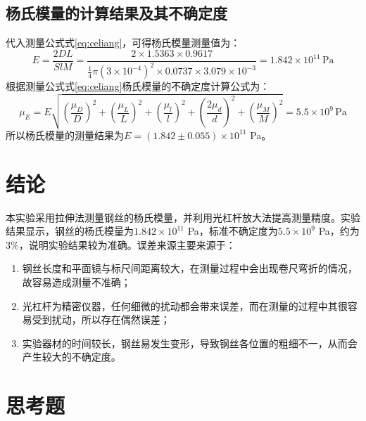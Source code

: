 \documentclass[a4paper]{extarticle}
\begin{document}
    \subsection{杨氏模量的计算结果及其不确定度}
    \hspace{2em}
    代入测量公式式\ref{eq:celiang}，可得杨氏模量测量值为：
    \begin{equation*}
        E=\frac{2DL}{SlM}=\frac{2\times1.5363\times0.9617}{\frac{1}{4}\pi\left(3\times10^{-4}\right)^2\times0.0737\times3.079\times10^{-3}}=1.842\times10^{11}\,\text{Pa}
    \end{equation*}
    \hspace{2em}
    根据测量公式式\ref{eq:celiang}杨氏模量的不确定度计算公式为：
    \begin{equation*}
        \mu_E=E\sqrt{\left(\frac{\mu_D}{D}\right)^2+\left(\frac{\mu_L}{L}\right)^2+\left(\frac{\mu_l}{l}\right)^2+\left(\frac{2\mu_d}{d}\right)^2+\left(\frac{\mu_M}{M}\right)^2}=5.5\times10^9\,\text{Pa}
    \end{equation*}
    \hspace{2em}
    所以杨氏模量的测量结果为$E=(1.842\pm0.055)\times10^{11}$ Pa。
    \section{结论}
    \hspace{2em}
    本实验采用拉伸法测量钢丝的杨氏模量，并利用光杠杆放大法提高测量精度。实验结果显示，钢丝的杨氏模量为$1.842\times10^{11}$ Pa，标准不确定度为$5.5\times10^9$ Pa，约为$3\%$，说明实验结果较为准确。误差来源主要来源于：
    \begin{enumerate}
        \item 钢丝长度和平面镜与标尺间距离较大，在测量过程中会出现卷尺弯折的情况，故容易造成测量不准确；
        \item 光杠杆为精密仪器，任何细微的扰动都会带来误差，而在测量的过程中其很容易受到扰动，所以存在偶然误差；
        \item 实验器材的时间较长，钢丝易发生变形，导致钢丝各位置的粗细不一，从而会产生较大的不确定度。
    \end{enumerate}
    \section{思考题}
\end{document}
